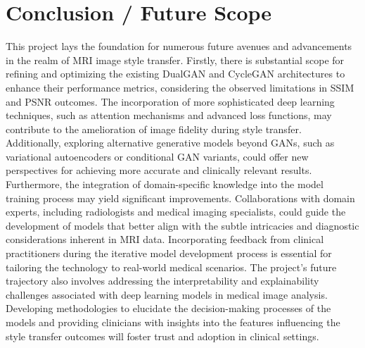 \documentclass[conference]{IEEEtran}
\begin{document}
\section{Conclusion / Future Scope}
This project lays the foundation for numerous future avenues and advancements in the realm of MRI image style transfer. Firstly, there is substantial scope for refining and optimizing the existing DualGAN and CycleGAN architectures to enhance their performance metrics, considering the observed limitations in SSIM and PSNR outcomes. The incorporation of more sophisticated deep learning techniques, such as attention mechanisms and advanced loss functions, may contribute to the amelioration of image fidelity during style transfer. Additionally, exploring alternative generative models beyond GANs, such as variational autoencoders or conditional GAN variants, could offer new perspectives for achieving more accurate and clinically relevant results.
Furthermore, the integration of domain-specific knowledge into the model training process may yield significant improvements. Collaborations with domain experts, including radiologists and medical imaging specialists, could guide the development of models that better align with the subtle intricacies and diagnostic considerations inherent in MRI data. Incorporating feedback from clinical practitioners during the iterative model development process is essential for tailoring the technology to real-world medical scenarios.
The project's future trajectory also involves addressing the interpretability and explainability challenges associated with deep learning models in medical image analysis. Developing methodologies to elucidate the decision-making processes of the models and providing clinicians with insights into the features influencing the style transfer outcomes will foster trust and adoption in clinical settings.
\end{document}

